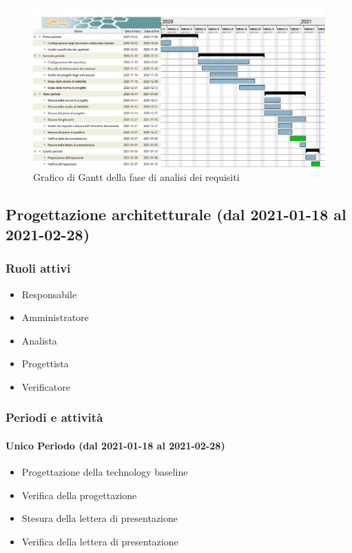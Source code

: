\begin{landscape}
	\begin{figure}[H]
		\centering
		\includegraphics[width=\linewidth]{res/images/ganttFaseAnalisi.png}
		\caption{Grafico di Gantt della fase di analisi dei requisiti}
		\label{fig:Gantt Analisi dei requisiti}
	\end{figure}
\end{landscape}

\subsection{Progettazione architetturale (dal 2021-01-18 al 2021-02-28)}

\subsubsection{Ruoli attivi}
\begin{itemize}
	\item Responsabile
	\item Amministratore
	\item Analista
	\item Progettista
	\item Verificatore
\end{itemize}

\subsubsection{Periodi e attività}
\paragraph{Unico Periodo (dal 2021-01-18 al 2021-02-28)}
\begin{itemize}
	\item Progettazione della technology baseline
	\item Verifica della progettazione
	\item Stesura della lettera di presentazione
	\item Verifica della lettera di presentazione
\end{itemize}

